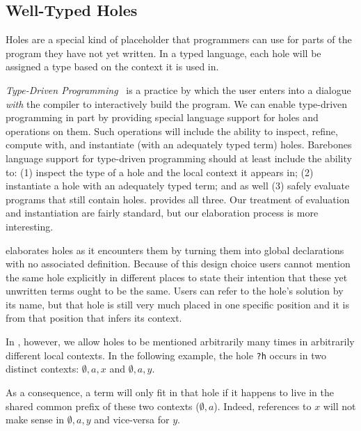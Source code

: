 \subsection{Well-Typed Holes}
\label{sec:design:holes}

Holes are a special kind of placeholder that programmers can use for parts of the program they have not yet written.
%
In a typed language, each hole will be assigned a type based on the context it is used in.

\emph{Type-Driven Programming}~\cite{DBLP:journals/pacmpl/OmarVCH19} is a practice by which the user enters into a dialogue \emph{with} the compiler to interactively build the program.
We can enable type-driven programming in part by providing special language support for holes and operations on them.
Such operations will include the ability to inspect, refine, compute with, and instantiate (with an adequately typed term) holes.
%
Barebones language support for type-driven programming should at least include the ability to:
%
(1) inspect the type of a hole and the local context it appears in;
%
(2) instantiate a hole with an adequately typed term;
%
and as well
%
(3) safely evaluate programs that still contain holes.
%
\Velo{} provides all three.
%
Our treatment of evaluation and instantiation are fairly standard, but our elaboration process is more interesting.

\Idris{} elaborates holes as it encounters them by turning them into
global declarations with no associated definition.
%
Because of this design choice users cannot mention the same hole explicitly in different places to state their intention that these yet unwritten terms ought to be the same.
%
Users can refer to the hole's solution by its name, but that hole is still very much placed in one specific position and it is from that position that \Idris{} infers its context.

In \Velo{}, however, we allow holes to be mentioned arbitrarily many times in
arbitrarily different local contexts.
%
In the following example, the hole \texttt{?h} occurs in two distinct contexts: $\emptyset,a,x$ and $\emptyset,a,y$.

\begin{center}
  \holeexamplegraph{}
\end{center}

As a consequence, a term will only fit in that hole if it happens to live in the shared common prefix of these two contexts ($\emptyset,a$).
%
Indeed, references to $x$ will not make sense in $\emptyset,a,y$ and vice-versa for $y$.


